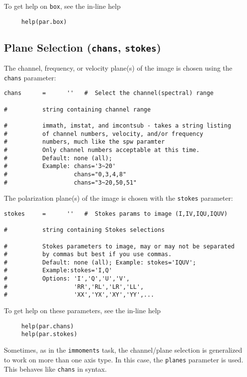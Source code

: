 To get help on {\tt box}, see the in-line help
\small
\begin{verbatim}
     help(par.box)
\end{verbatim}
\normalsize

\subsection{Plane Selection ({\tt chans}, {\tt stokes})}
\label{section:analysis.pars.planes}

The channel, frequency, or velocity plane(s) of the image is chosen
using the {\tt chans} parameter:
\small
\begin{verbatim}
chans      =      ''   #  Select the channel(spectral) range

#          string containing channel range

#          immath, imstat, and imcontsub - takes a string listing
#          of channel numbers, velocity, and/or frequency
#          numbers, much like the spw paramter
#          Only channel numbers acceptable at this time.
#          Default: none (all);  
#          Example: chans='3~20'    
#                   chans="0,3,4,8"
#                   chans="3~20,50,51"
\end{verbatim}
\normalsize

The polarization plane(s) of the image is chosen with the {\tt stokes}
parameter:
\small
\begin{verbatim}
stokes     =      ''   #  Stokes params to image (I,IV,IQU,IQUV)

#          string containing Stokes selections

#          Stokes parameters to image, may or may not be separated
#          by commas but best if you use commas.
#          Default: none (all); Example: stokes='IQUV';  
#          Example:stokes='I,Q'
#          Options: 'I','Q','U','V',
#                   'RR','RL','LR','LL',
#                   'XX','YX','XY','YY',...
\end{verbatim}
\normalsize

To get help on these parameters, see the in-line help
\small
\begin{verbatim}
     help(par.chans)
     help(par.stokes)
\end{verbatim}
\normalsize

Sometimes, as in the {\tt immoments} task, the channel/plane 
selection is generalized to work on more than one axis type.
In this case, the {\tt planes} parameter is used.  This behaves
like {\tt chans} in syntax.

